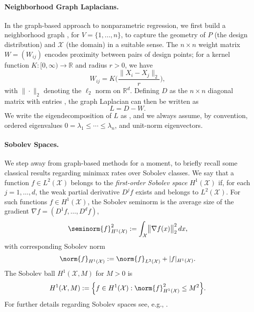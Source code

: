 \documentclass[twoside]{article}
\newcommand{\red}[1]{\textcolor{red}{#1}}
\newcommand{\green}[1]{\textcolor{green}{#1}}
\newcommand{\sbcomment}[1]{{\bf{{\red{{SB --- #1}}}}}}
\newcommand{\agcomment}[1]{{\bf{{\green{{AG --- #1}}}}}}
\newcommand{\Reals}{\mathbb{R}}
\newcommand{\1}{\mathbf{1}}
\newcommand{\Rd}{\Reals^d}
\newcommand{\Lap}{L}
\newcommand{\Xset}{\mathcal{X}}
\newcommand{\Leb}{L}
\theoremstyle{definition}
\theoremstyle{remark}
\begin{document}
\paragraph{Neighborhood Graph Laplacians.}

In the graph-based approach to nonparametric regression, we first build a neighborhood graph , for $V=\{1,\ldots,n\}$, to capture the geometry of $P$ (the design distribution) and $\Xset$ (the domain) in a suitable sense. The $n \times n$ weight matrix $W = (W_{ij})$ encodes proximity between pairs of design points; for a kernel function $K: [0,\infty) \to \Reals$ and radius $r > 0$, we have
\begin{equation*}
\label{eqn:neighborhood_graph}
W_{ij} = K\Biggl(\frac{\|X_i - X_j\|_2}{r}\Biggr),
\end{equation*}
with $\|\cdot\|_2$ denoting the $\ell_2$ norm on $\Rd$. Defining $D$ as the $n \times n$ diagonal matrix with entries , the graph Laplacian can then be written as
\begin{equation}
\label{eqn:graph_Laplacian}
\Lap = D - W.
\end{equation}
We write the eigendecomposition of $L$ as , and we always assume, by convention, ordered eigenvalues $0 = \lambda_1 \leq \cdots \leq \lambda_n$, and unit-norm eigenvectors. \\


\paragraph{Sobolev Spaces.}

We step away from graph-based methods for a moment, to briefly recall some classical results regarding minimax rates over Sobolev classes. We say that a function $f \in \Leb^2(\Xset)$ belongs to the \emph{first-order Sobolev space} $H^1(\Xset)$ if, for each $j = 1,\ldots,d$, the weak partial derivative $D^j f$ exists and belongs to $\Leb^2(\Xset)$. For such functions $f \in H^1(\Xset)$, the Sobolev seminorm \smash{$\seminorm{f}_{H^{1}(\Xset)}$} is the average size of the gradient $\nabla f = (D^1 f, \ldots, D^d f)$, 
\begin{equation*}
\seminorm{f}_{H^1(\Xset)}^2 := \int_{\Xset} \bigl\|\nabla f(x)\bigr\|_2^2 \,dx,
\end{equation*}
with corresponding Sobolev norm 
\begin{equation*}
\norm{f}_{H^1(\Xset)} := \norm{f}_{\Leb^2(\Xset)} + |f|_{H^1(\Xset)}.
\end{equation*}
The Sobolev ball $H^1(\Xset,M)$ for $M > 0$ is
\begin{equation*}
H^1(\Xset,M) := \Bigl\{f \in H^1(\Xset): \norm{f}_{H^1(\Xset)}^2 \leq M^2\Bigr\}.
\end{equation*}
For further details regarding Sobolev spaces see, e.g., \citet{evans10,leoni2017}.
\end{document}
